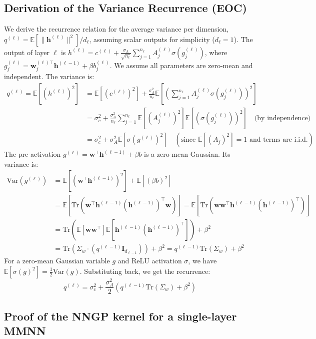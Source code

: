 \documentclass[12pt]{article}
\begin{document}
\subsection{Derivation of the Variance Recurrence (EOC)}
We derive the recurrence relation for the average variance per dimension, $q^{(\ell)} = \mathbb{E}[\|\bm{h}^{(\ell)}\|^2]/d_\ell$, assuming scalar outputs for simplicity ($d_\ell=1$).
The output of layer $\ell$ is $h^{(\ell)} = c^{(\ell)} + \frac{\sigma_A}{\sqrt{n_\ell}} \sum_{j=1}^{n_\ell} A_j^{(\ell)} \sigma(g_j^{(\ell)})$, where $g_j^{(\ell)} = \bm{w}_j^{(\ell)\top} \bm{h}^{(\ell-1)} + \beta b_j^{(\ell)}$.
We assume all parameters are zero-mean and independent. The variance is:
\begin{align*}
    q^{(\ell)} = \mathbb{E}[(h^{(\ell)})^2] &= \mathbb{E}[(c^{(\ell)})^2] + \frac{\sigma_A^2}{n_\ell} \mathbb{E}\left[ \left( \sum_{j=1}^{n_\ell} A_j^{(\ell)} \sigma(g_j^{(\ell)}) \right)^2 \right] \\
    &= \sigma_c^2 + \frac{\sigma_A^2}{n_\ell} \sum_{j=1}^{n_\ell} \mathbb{E}[(A_j^{(\ell)})^2] \mathbb{E}[(\sigma(g_j^{(\ell)}))^2] \quad \text{(by independence)} \\
    &= \sigma_c^2 + \sigma_A^2 \mathbb{E}[\sigma(g^{(\ell)})^2] \quad (\text{since } \mathbb{E}[(A_j)^2]=1 \text{ and terms are i.i.d.})
\end{align*}
The pre-activation $g^{(\ell)} = \bm{w}^\top \bm{h}^{(\ell-1)} + \beta b$ is a zero-mean Gaussian. Its variance is:
\begin{align*}
    \text{Var}(g^{(\ell)}) &= \mathbb{E}[(\bm{w}^\top \bm{h}^{(\ell-1)})^2] + \mathbb{E}[(\beta b)^2] \\
    &= \mathbb{E}[\text{Tr}(\bm{w}^\top \bm{h}^{(\ell-1)} (\bm{h}^{(\ell-1)})^\top \bm{w})] = \mathbb{E}[\text{Tr}(\bm{w}\bm{w}^\top \bm{h}^{(\ell-1)}(\bm{h}^{(\ell-1)})^\top)] \\
    &= \text{Tr}(\mathbb{E}[\bm{w}\bm{w}^\top] \mathbb{E}[\bm{h}^{(\ell-1)}(\bm{h}^{(\ell-1)})^\top]) + \beta^2 \\
    &= \text{Tr}(\Sigma_w \cdot (q^{(\ell-1)} \mathbf{I}_{d_{\ell-1}})) + \beta^2 = q^{(\ell-1)}\text{Tr}(\Sigma_w) + \beta^2
\end{align*}
For a zero-mean Gaussian variable $g$ and ReLU activation $\sigma$, we have $\mathbb{E}[\sigma(g)^2] = \frac{1}{2}\text{Var}(g)$.
Substituting back, we get the recurrence:
\[ q^{(\ell)} = \sigma_c^2 + \frac{\sigma_A^2}{2} \left( q^{(\ell-1)}\text{Tr}(\Sigma_w) + \beta^2 \right) \]

\subsection{Proof of the NNGP kernel for a single-layer MMNN}
\end{document}

